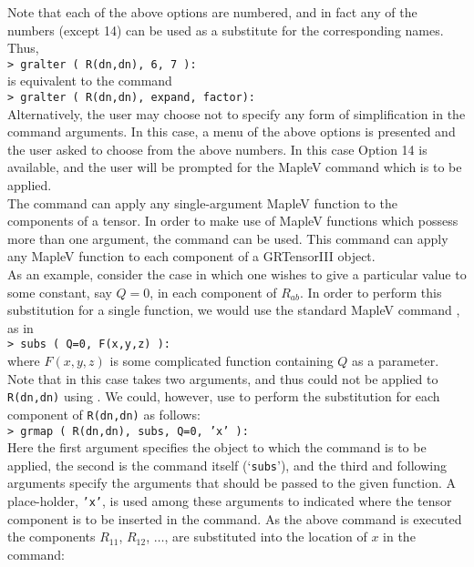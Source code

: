 \documentclass{article}
\begin{document}
{{{Note that each of the above options are numbered, and in fact any of the
numbers (except 14) can be used as a substitute for the corresponding names. 
Thus,\\

\noindent \texttt{> gralter ( R(dn,dn), 6, 7 ):}\\

\noindent is equivalent to the command\\

\noindent \texttt{> gralter ( R(dn,dn), expand, factor):}\\

Alternatively, the user may choose not to specify any form of simplification
in the command arguments. In this case, a menu of the above options is
presented and the user asked to choose from the above numbers. In this
case Option 14 is available, and the user will be prompted for the MapleV
command which is to be applied.\\

The  command can apply any single-argument MapleV function
to the components of a tensor. In order to make use of MapleV
functions which possess more than one argument, the
 command can be used. This command can apply any MapleV
function to each component of a GRTensorIII object.\\

As an example, consider the case in which one wishes to give a particular
value to some constant, say $Q = 0$, in each component of $R_{ab}$. 
In order to perform this substitution for a single function, we would 
use the standard MapleV command , as in\\

\noindent\texttt{> subs ( Q=0, F(x,y,z) ):}\\

\noindent where $F(x,y,z)$ is some complicated function containing $Q$
as a parameter. Note that in this case  takes two arguments,
and thus could not be applied to \texttt{R(dn,dn)} using .
We could, however, use  to perform the substitution for each
component of \texttt{R(dn,dn)} as follows:\\

\noindent\texttt{> grmap ( R(dn,dn), subs, Q=0, 'x' ):}\\

Here the first argument specifies the object to which the command is
to be applied, the second is the command itself (`\texttt{subs}'), and
the third and following arguments specify the arguments that should be
passed to the given function. A place-holder, \texttt{'x'}, is used
among these arguments to indicated where the tensor component is to be
inserted in the command. As the above command is executed the
components $R_{11}$, $R_{12}$, $\ldots$, are substituted into the
location of $x$ in the command:\\

}}}
\end{document}

